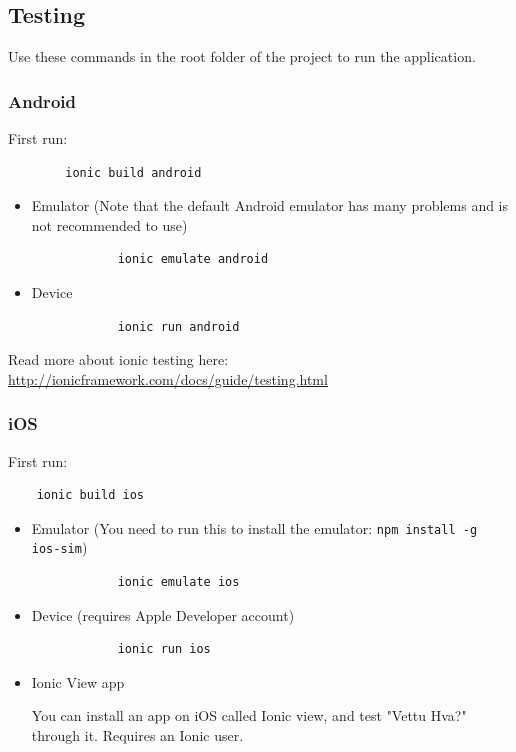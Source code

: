 \begin{appendices}
\subsection{Testing} 

Use these commands in the root folder of the project to run the application.

\subsubsection{Android}

First run:
	\begin{verbatim}
		ionic build android
	\end{verbatim}
\begin{itemize}
	\item Emulator (Note that the default Android emulator has many problems and is not recommended to use)
		\begin{verbatim}
			ionic emulate android
		\end{verbatim}
	\item Device
		\begin{verbatim}
			ionic run android
		\end{verbatim}
\end{itemize}

Read more about ionic testing here: \url{http://ionicframework.com/docs/guide/testing.html}

\subsubsection{iOS}

First run:
\begin{verbatim}
	ionic build ios
\end{verbatim}

\begin{itemize}
	\item Emulator
		(You need to run this to install the emulator: \verb|npm install -g ios-sim|)
		\begin{verbatim}
			ionic emulate ios
		\end{verbatim}
	\item Device (requires Apple Developer account)
		\begin{verbatim}
			ionic run ios
		\end{verbatim}
	\item Ionic View app

You can install an app on iOS called Ionic view, and test "Vettu Hva?" through it. 
Requires an Ionic user. 


\end{itemize}
\end{appendices}
